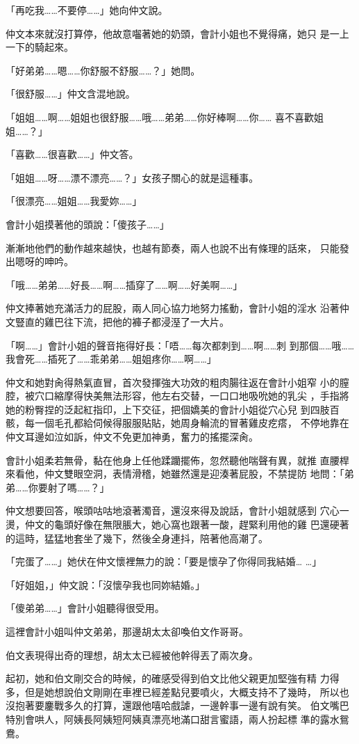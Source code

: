 「再吃我……不要停……」她向仲文說。

仲文本來就沒打算停，他故意囓著她的奶頭，會計小姐也不覺得痛，她只
是一上一下的騎起來。

「好弟弟……嗯……你舒服不舒服……？」她問。

「很舒服……」仲文含混地說。

「姐姐……啊……姐姐也很舒服……哦……弟弟……你好棒啊……你……
喜不喜歡姐姐……？」

「喜歡……很喜歡……」仲文答。

「姐姐……呀……漂不漂亮……？」女孩子關心的就是這種事。

「很漂亮……姐姐……我愛妳……」

會計小姐摸著他的頭說：「傻孩子……」

漸漸地他們的動作越來越快，也越有節奏，兩人也說不出有條理的話來，
只能發出嗯呀的呻吟。

「哦……弟弟……好長……啊……插穿了……啊……好美啊……」

仲文捧著她充滿活力的屁股，兩人同心協力地努力搖動，會計小姐的淫水
沿著仲文豎直的雞巴往下流，把他的褲子都浸溼了一大片。

「啊……」會計小姐的聲音拖得好長：「唔……每次都刺到……啊……刺
到那個……哦……我會死……插死了……乖弟弟……姐姐疼你……啊……」

仲文和她對肏得熱氣直冒，首次發揮強大功效的粗肉腸往返在會計小姐窄
小的膣腔，被穴口縮摩得快美無法形容，他左右交替，一口口地吸吮她的乳尖
，手指將她的粉臀捏的泛起紅指印，上下交征，把個嬌美的會計小姐從穴心兒
到四肢百骸，每一個毛孔都給伺候得服服貼貼，她周身輪流的冒著雞皮疙瘩，
不停地靠在仲文耳邊如泣如訴，仲文不免更加神勇，奮力的搖擺深肏。

會計小姐柔若無骨，黏在他身上任他蹂躪擺佈，忽然聽他喘聲有異，就推
直腰桿來看他，仲文雙眼空洞，表情滑稽，她雖然還是迎湊著屁股，不禁提防
地問：「弟弟……你要射了嗎……？」

仲文想要回答，喉頭咕咕地滾著濁音，還沒來得及說話，會計小姐就感到
穴心一燙，仲文的龜頭好像在無限脹大，她心窩也跟著一酸，趕緊利用他的雞
巴還硬著的這時，猛猛地套坐了幾下，然後全身連抖，陪著他高潮了。

「完蛋了……」她伏在仲文懷裡無力的說：「要是懷孕了你得同我結婚…
…」

「好姐姐，」仲文說：「沒懷孕我也同妳結婚。」

「傻弟弟……」會計小姐聽得很受用。

這裡會計小姐叫仲文弟弟，那邊胡太太卻喚伯文作哥哥。

伯文表現得出奇的理想，胡太太已經被他幹得丟了兩次身。

起初，她和伯文剛交合的時候，的確感受得到伯文比他父親更加堅強有精
力得多，但是她想說伯文剛剛在車裡已經差點兒要噴火，大概支持不了幾時，
所以也沒抱著要鏖戰多久的打算，還跟他嘻哈戲謔，一邊幹事一邊有說有笑。
伯文嘴巴特別會哄人，阿姨長阿姨短阿姨真漂亮地滿口甜言蜜語，兩人扮起標
準的露水鴛鴦。

